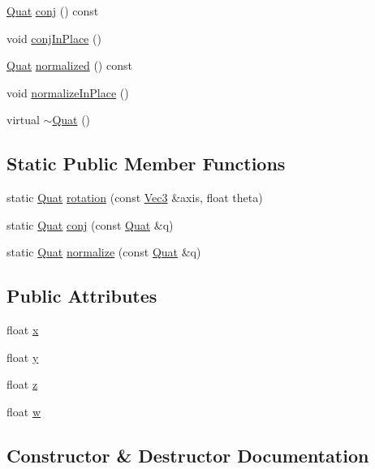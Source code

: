\begin{DoxyCompactItemize}
\item 
\hyperlink{class_quat}{Quat} \hyperlink{class_quat_a8bf45758ed6b85b2bb79f31aecd350f9}{conj} () const 
\item 
void \hyperlink{class_quat_abd896204b645233e78b889db22f05712}{conj\+In\+Place} ()
\item 
\hyperlink{class_quat}{Quat} \hyperlink{class_quat_a733121f97f214500918db10a0cb3d50d}{normalized} () const 
\item 
void \hyperlink{class_quat_ae486e184bcccaf635b6b9f073bf4b98d}{normalize\+In\+Place} ()
\item 
virtual \hyperlink{class_quat_ad5f48cdced8fc709fca4de2817f41189}{$\sim$\+Quat} ()
\end{DoxyCompactItemize}
\subsection*{Static Public Member Functions}
\begin{DoxyCompactItemize}
\item 
static \hyperlink{class_quat}{Quat} \hyperlink{class_quat_a9d86574f86e76884f278482d0fe43d46}{rotation} (const \hyperlink{class_vec3}{Vec3} \&axis, float theta)
\item 
static \hyperlink{class_quat}{Quat} \hyperlink{class_quat_a09f1573e8d2f9a1cf8e0ea2d035d2a50}{conj} (const \hyperlink{class_quat}{Quat} \&q)
\item 
static \hyperlink{class_quat}{Quat} \hyperlink{class_quat_a689357c9fa948293a8c0731a21399417}{normalize} (const \hyperlink{class_quat}{Quat} \&q)
\end{DoxyCompactItemize}
\subsection*{Public Attributes}
\begin{DoxyCompactItemize}
\item 
float \hyperlink{class_quat_a15db053bd6750a53e33bf30a0250c288}{x}
\item 
float \hyperlink{class_quat_ac6045ee4149a978a4ce429c132e46fa2}{y}
\item 
float \hyperlink{class_quat_a611fbb79f7b802da4f1c65a31c2c5fea}{z}
\item 
float \hyperlink{class_quat_ad3aeee2134443ec0897793834209b0c0}{w}
\end{DoxyCompactItemize}


\subsection{Constructor \& Destructor Documentation}
